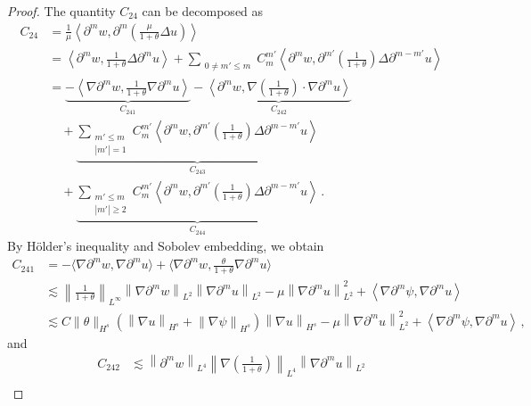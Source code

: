 \documentclass[reqno,11pt]{amsart}
\numberwithin{equation}{section}
\def\p{\partial}
\begin{document}
\begin{proof}
The quantity $C_{24}$ can be decomposed as
\begin{align*}
C_{24}&=\frac{1}{\mu} \left\langle \partial^m w, \partial^m \left( \frac{\mu}{1+\theta} \Delta u \right) \right\rangle \\&
= \left\langle \partial^m w, \frac{1}{1+\theta} \Delta \partial^m u \right\rangle + \sum_{\substack{0 \neq m' \leq m}} C_m^{m'} \left\langle \partial^m w, \partial^{m'} \left( \frac{1}{1+\theta} \right) \Delta \partial^{m-m'} u \right\rangle \\&
= \underset{C_{241}}{\underbrace{-\left\langle \nabla \partial^m w, \frac{1}{1+\theta} \nabla \partial^m u \right\rangle }} - \underset{C_{242}}{\underbrace{\left\langle \partial^m w, \nabla \left( \frac{1}{1+\theta} \right) \cdot \nabla \partial^m u \right\rangle }} \\&
\quad+ \underset{C_{243}}{\underbrace{\sum_{\substack{m' \leq m \\ |m'|=1}} C_m^{m'} \left\langle \partial^m w, \partial^{m'} \left( \frac{1}{1+\theta} \right) \Delta \partial^{m-m'} u \right\rangle}} \\
& \quad+ \underset{C_{244}}{\underbrace{\sum_{\substack{m' \leq m \\ |m'| \geq 2}} C_m^{m'} \left\langle \partial^m w, \partial^{m'} \left( \frac{1}{1+\theta} \right) \Delta \partial^{m-m'} u \right\rangle}} \,.
\end{align*}
By H\"older's inequality and Sobolev embedding, we obtain
\begin{equation*}
\begin{aligned}
C_{241}&=-\langle\nabla\p^m w,\nabla \p^m u\rangle+\langle\nabla\p^m w,\frac{\theta}{1+\theta}\nabla \p^m u\rangle
\\&\lesssim \left\| \frac{1}{1+\theta} \right\|_{L^\infty} \left\| \nabla \partial^m w \right\|_{L^2} \left\| \nabla \partial^m u \right\|_{L^2} - \mu \left\| \nabla \partial^m u \right\|_{L^2}^2 + \left\langle \nabla\partial^m \psi, \nabla \partial^m u \right\rangle \\&
\lesssim C\|\theta\|_{H^s}\left( \left\| \nabla u \right\|_{H^s} + \left\| \nabla \psi \right\|_{H^s} \right) \left\| \nabla u \right\|_{H^s} - \mu \left\| \nabla \partial^m u \right\|_{L^2}^2 + \left\langle \nabla\partial^m \psi, \nabla \partial^m u \right\rangle \,,
\end{aligned}
\end{equation*}
and
\begin{equation*}
\begin{aligned}
C_{242}&\lesssim \left\| \partial^m w \right\|_{L^4} \left\| \nabla \left( \frac{1}{1+\theta} \right) \right\|_{L^4} \left\| \nabla \partial^m u \right\|_{L^2} \\&

\end{aligned}
\end{equation*}
\end{proof}
\end{document}
